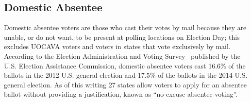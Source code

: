 
\subsection{Domestic Absentee}
Domestic absentee voters are those who cast their votes by mail
because they are unable, or do not want, to be present at polling
locations on Election Day; this excludes UOCAVA voters and voters in
states that vote exclusively by mail. According to the Election
Administration and Voting Survey~\cite{eacsurvey} published by the
U.S. Election Assistance Commission, domestic absentee voters cast
16.6\% of the ballots in the 2012 U.S. general election and 17.5\% of
the ballots in the 2014 U.S. general election. As of this writing 27
states allow voters to apply for an absentee ballot without providing
a justification, known as ``no-excuse absentee voting''.

